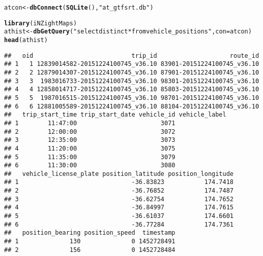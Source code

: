 \documentclass[11pt]{article}\usepackage[]{graphicx}\usepackage[]{color}
\makeatletter
\newcommand{\hlstr}[1]{\textcolor[rgb]{0.192,0.494,0.8}{#1}}%
\newcommand{\hlstd}[1]{\textcolor[rgb]{0.345,0.345,0.345}{#1}}%
\newcommand{\hlkwb}[1]{\textcolor[rgb]{0.69,0.353,0.396}{#1}}%
\newcommand{\hlkwc}[1]{\textcolor[rgb]{0.333,0.667,0.333}{#1}}%
\newcommand{\hlkwd}[1]{\textcolor[rgb]{0.737,0.353,0.396}{\textbf{#1}}}%
\newenvironment{kframe}{%
 \def\at@end@of@kframe{}%
 \ifinner\ifhmode%
  \def\at@end@of@kframe{\end{minipage}}%
  \begin{minipage}{\columnwidth}%
 \fi\fi%
 \def\FrameCommand##1{\hskip\@totalleftmargin \hskip-\fboxsep
 \colorbox{shadecolor}{##1}\hskip-\fboxsep
     \hskip-\linewidth \hskip-\@totalleftmargin \hskip\columnwidth}%
 \MakeFramed {\advance\hsize-\width
   \@totalleftmargin\z@ \linewidth\hsize
   \@setminipage}}%
 {\par\unskip\endMakeFramed%
 \at@end@of@kframe}
\newenvironment{knitrout}{}{} %
\makeatother
\begin{document}
\begin{knitrout}
\color{fgcolor}\begin{kframe}
\begin{alltt}
\hlstd{atcon} \hlkwb{<-} \hlkwd{dbConnect}\hlstd{(}\hlkwd{SQLite}\hlstd{(),} \hlstr{"at_gtfsrt.db"}\hlstd{)}
\end{alltt}
\end{kframe}
\end{knitrout}

\begin{knitrout}
\color{fgcolor}\begin{kframe}
\begin{alltt}
\hlkwd{library}\hlstd{(iNZightMaps)}
\hlstd{athist} \hlkwb{<-} \hlkwd{dbGetQuery}\hlstd{(}\hlstr{"select distinct * from vehicle_positions"}\hlstd{,} \hlkwc{con} \hlstd{= atcon)}
\hlkwd{head}\hlstd{(athist)}
\end{alltt}
\begin{verbatim}
##   oid                           trip_id                    route_id
## 1   1 12839014582-20151224100745_v36.10 83901-20151224100745_v36.10
## 2   2 12879014307-20151224100745_v36.10 87901-20151224100745_v36.10
## 3   3  1983016733-20151224100745_v36.10 98301-20151224100745_v36.10
## 4   4 12858014717-20151224100745_v36.10 85803-20151224100745_v36.10
## 5   5  1987016515-20151224100745_v36.10 98701-20151224100745_v36.10
## 6   6 12881005589-20151224100745_v36.10 88104-20151224100745_v36.10
##   trip_start_time trip_start_date vehicle_id vehicle_label
## 1        11:47:00                       3071              
## 2        12:00:00                       3072              
## 3        12:35:00                       3073              
## 4        11:20:00                       3075              
## 5        11:35:00                       3079              
## 6        11:30:00                       3080              
##   vehicle_license_plate position_latitude position_longitude
## 1                               -36.83823           174.7418
## 2                               -36.76852           174.7487
## 3                               -36.62754           174.7652
## 4                               -36.84997           174.7615
## 5                               -36.61037           174.6601
## 6                               -36.77284           174.7361
##   position_bearing position_speed  timestamp
## 1              130              0 1452728491
## 2              156              0 1452728484

\end{verbatim}
\end{kframe}
\end{knitrout}
\end{document}
